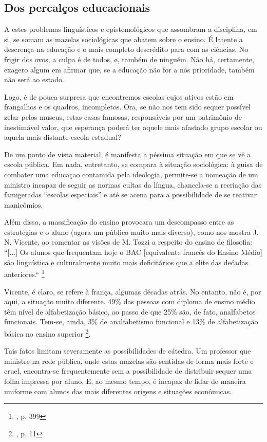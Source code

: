 \documentclass[12pt,a4paper]{article}
\begin{document}
	\newpage

	\subsection*{Dos percalços educacionais}

	A estes problemas linguísticos e epistemológicos que assombram 
	a disciplina, em si, se somam as mazelas sociológicas que abatem 
	sobre o ensino. É latente a descrença na educação e o mais completo 
	descrédito para com as ciências. No frigir dos ovos, a culpa é de 
	todos, e, também de ninguém. Não há, certamente, exagero algum em 
	afirmar que, se a educação não for a nós prioridade, também não 
	será ao estado. 

	Logo, é de pouca surpresa que encontremos escolas cujos ativos estão 
	em frangalhos e os quadros, incompletos. Ora, se não nos tem sido 
	sequer possível zelar pelos museus, estas casas famosas, responsáveis 
	por um patrimônio de inestimável valor, que esperança poderá ter 
	aquele mais afastado grupo escolar ou aquela mais distante escola 
	estadual? 

	De um ponto de vista material, é manifesta a péssima situação em 
	que se vê a escola pública. Em nada, entretanto, se compara à 
	situação sociológica: à guisa de combater uma educaçao contamida 
	pela ideologia, permite-se a nomeação de um ministro incapaz de 
	seguir as normas cultas da língua, chancela-se a recriação das 
	famigeradas “escolas especiais” e até se acena para a 
	possibilidade de se reativar manicômios. 

	Além disso, a massificação do ensino provocara um descompasso entre 
	as estratégias e o aluno (agora um público muito mais diverso), como 
	nos mostra J. N. Vicente, ao comentar as visões de M. Tozzi a respeito 
	do ensino de filosofia: 
		“[...] Os alunos que frequentam hoje o BAC [equivalente francês 
		do Ensino Médio] são linguística e culturalmente muito mais 
		deficitários que a elite das dećadas anteriores.“
		\footnote{\cite{neves}, p. 399}
	
	Vicente, é claro, se refere à frança, algumas décadas atrás. No 
	entanto, não é, por aqui, a situação muito diferente. 49\% das 
	pessoas com diploma de ensino médio têm nível de alfabetização 
	básico, ao passo de que 25\% são, de fato, analfabetos funcionais. 
	Tem-se, ainda, 3\% de analfabetismo funcional e 13\% de 
	alfabetização básica no ensino superior
	\footnote{\cite{inaf2018}, p. 11}.

	Tais fatos limitam severamente as possibilidades de cátedra. 
	Um professor que ministre na rede pública, onde estas mazelas são 
	sentidas de forma mais forte e cruel, encontra-se frequentemente 
	sem a possibilidade de distribuir sequer uma folha impressa por 
	aluno. E, ao mesmo tempo, é incapaz de lidar de maneira uniforme 
	com alunos das mais diferentes origens e situações econômicas. 
\end{document}
